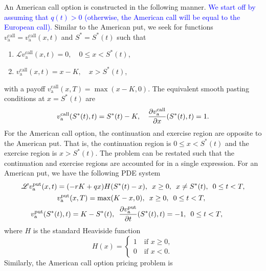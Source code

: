 	An American call option is constructed in the following manner. \textcolor{blue}{We start off by assuming that $q(t) > 0$ (otherwise, the American call will be equal to the European call).} Similar to the American put, we seek for functions $v_\text{a}^{\text{call}} = v_\text{a}^{\text{call}}(x,t)$ and $S^* = S^*(t)$ such that
	\begin{enumerate}
			\item $\mathscr{L}v_\text{a}^{\text{call}}(x,t) = 0, \quad 0 \leq x < S^*(t)$,
			\item $v_\text{a}^{\text{call}}(x,t) = x - K, \quad x > S^*(t)$,
	\end{enumerate}
	with a payoff $v_\text{a}^{\text{call}}(x,T) = \max(x-K,0)$. The equivalent smooth pasting conditions at $x = S^*(t)$ are
		\begin{equation*}
			v_\text{a}^{\text{call}}(S^*(t),t) = S^*(t) - K, \quad \frac{\partial v_\text{a}^{\text{call}}}{\partial x}(S^*(t),t) = 1.
		\end{equation*}
	For the American call option, the continuation and exercise region are opposite to the American put. That is, the continuation region is $0 \leq x < S^*(t)$ and the exercise region is $x > S^*(t)$. The problem can be restated such that the continuation and exercise regions are accounted for in a single expression. For an American put, we have the following PDE system
    \begin{align}
            \label{eqn:amerput}
            \mathscr{L}v_\text{a}^{\text{put}}(x,t) &= (-rK + qx)H(S^*(t)-x), \enskip x \geq 0, \enskip x \neq S^*(t), \enskip 0 \leq t < T,\\
            \label{eqn:amerputTerminal}
            &v_\text{a}^{\text{put}}(x,T) = \max(K-x,0), \enskip x \geq 0, \enskip 0 \leq t < T,\\
            \label{eqn:amerputpasting}
           v_\text{a}^{\text{put}}(S^*( & t),t) = K - S^*(t), \enskip \frac{\partial v_\text{a}^{\text{put}}}{\partial t}(S^*(t),t) = -1, \enskip 0 \leq t < T,
    \end{align}
    where $H$ is the standard Heaviside function
      \begin{equation}
      		\label{eqn:heaviside}
          H(x) =
          \begin{cases}
            1 \quad \text{if } x \geq 0, \\
            0 \quad \text{if } x < 0.
        \end{cases}
      \end{equation}
Similarly, the American call option pricing problem is
